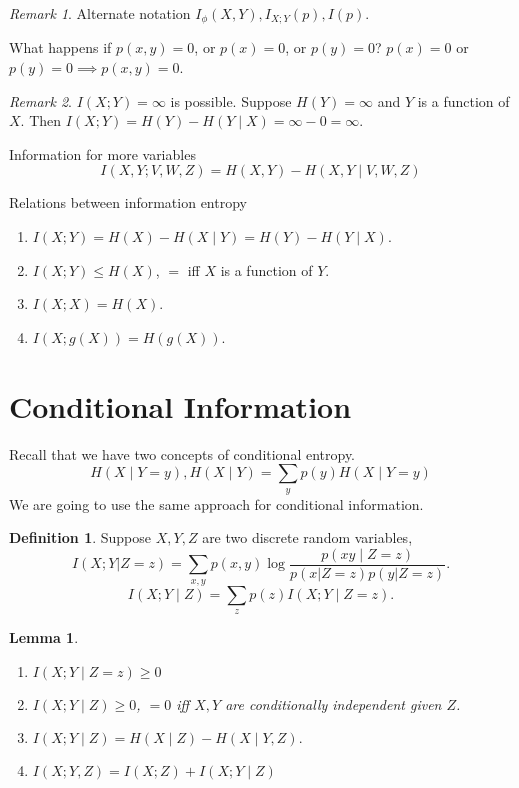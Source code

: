 \documentclass{report}
\newtheorem{lemma}{Lemma}[section]
\theoremstyle{definition}
\newtheorem{definition}{Definition}[section]
\theoremstyle{remark}
\newtheorem*{remark}{Remark}
\numberwithin{equation}{section}
\begin{document}
\begin{remark}
  Alternate notation \(
    I_\phi(X, Y), I_{X; Y}(p), I(p).  
  \)
\end{remark}

What happens if $p(x, y) = 0$, or $p(x) = 0$, or $p(y) = 0$? $p(x) = 0$ or $p(y) = 0 \implies p(x, y) = 0$.

\begin{remark}
  $I(X;Y) = \infty$ is possible. Suppose $H(Y) = \infty$ and $Y$ is a function of $X$. Then $I(X; Y) = H(Y) - H(Y \mid X) = \infty - 0 = \infty$.
\end{remark}

Information for more variables \[
  I(X, Y ; V, W, Z) = H(X,Y) - H(X,Y \mid V, W, Z)  
\]

Relations between information entropy
\begin{enumerate}
  \item $I(X; Y) = H(X) - H(X \mid Y) = H(Y) - H(Y \mid X)$.
  \item $I(X; Y) \leq H(X)$, $=$ iff $X$ is a function of $Y$.
  \item $I(X; X) = H(X)$.
  \item $I(X; g(X)) = H(g(X))$.
\end{enumerate}

\section{Conditional Information}
Recall that we have two concepts of conditional entropy.
\[
  H(X \mid Y = y) , H(X \mid Y) = \sum_y p(y) H(X \mid Y = y) 
\]
We are going to use the same approach for conditional information.
\begin{definition}
  Suppose $X, Y, Z$ are two discrete random variables, \[
    I(X; Y | Z = z) = \sum_{x, y} p(x, y) \log \frac{p(xy \mid Z = z)}{p(x| Z = z)p(y| Z = z)}.
  \] \[I(X; Y \mid Z) = \sum_z p(z) I(X; Y \mid Z = z).\]
\end{definition}

\begin{lemma}
  \begin{enumerate}
    \item \(I(X ; Y \mid Z = z) \geq 0\)
    \item \(I(X; Y \mid Z) \geq 0\), \(= 0\) iff $X, Y$ are conditionally independent given $Z$.
    \item \(I(X; Y \mid Z) = H(X \mid Z) - H(X \mid Y,Z).\)
    \item \(I(X; Y, Z) = I(X; Z) + I(X; Y \mid Z)\)
  \end{enumerate}
\end{lemma}
\end{document}
